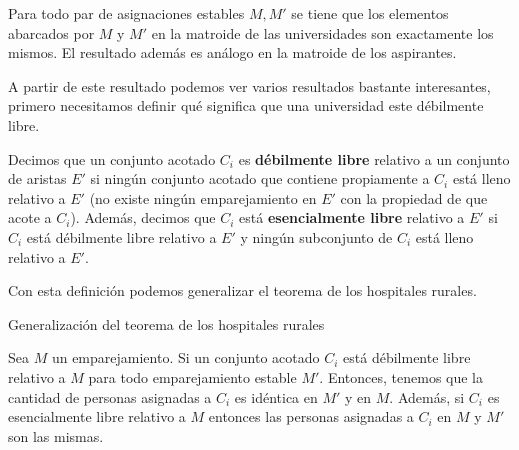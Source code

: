\begin{teo}
\label{help}
Para todo par de asignaciones estables $M,M'$ se tiene que los elementos abarcados por $M$ y $M'$ en la matroide de las universidades son exactamente los mismos. El resultado además es análogo en la matroide de los aspirantes. 
\end{teo}

A partir de este resultado podemos ver varios resultados bastante interesantes, primero necesitamos definir qué significa que una universidad este débilmente libre. 

\begin{dfn}
Decimos que un conjunto acotado $C_i$ es \textbf{débilmente libre} relativo a un conjunto de aristas $E'$ si ningún conjunto acotado que contiene propiamente a $C_i$ está lleno relativo a $E'$ (no existe ningún emparejamiento en $E'$ con la propiedad de que acote a $C_i$). Además, decimos que $C_i$ está \textbf{esencialmente libre} relativo a $E'$ si $C_i$ está débilmente libre relativo a $E'$ y ningún subconjunto de $C_i$ está lleno relativo a $E'$. 
\end{dfn}

Con esta definición podemos generalizar el teorema de los hospitales rurales. 

\begin{teo}{Generalización del teorema de los hospitales rurales}

Sea $M$ un emparejamiento. Si un conjunto acotado $C_i$ está débilmente libre relativo a $M$ para todo emparejamiento estable $M'$. Entonces, tenemos que la cantidad de personas asignadas a $C_i$ es idéntica en $M'$ y en $M$. Además, si $C_i$ es esencialmente libre relativo a $M$ entonces las personas asignadas a $C_i$ en $M$ y $M'$ son las mismas. 
\end{teo}

